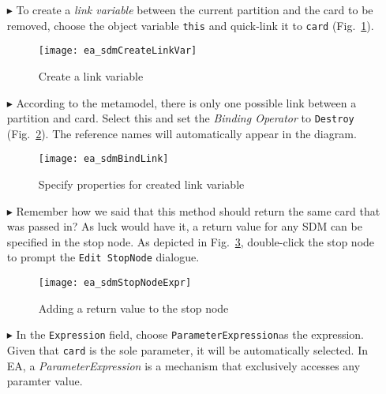 \begin{itemize}
\item[$\blacktriangleright$] To create a \emph{link variable} between the current partition and the card to be removed, choose the object variable \texttt{this}
and quick-link it to \texttt{card} (Fig.~\ref{fig:link_variable}).

\begin{figure}[htpb]
\begin{center}
  \texttt{[image: ea\_sdmCreateLinkVar]}
  \caption{Create a link variable}   
  \label{fig:link_variable}
\end{center}
\end{figure}

\item[$\blacktriangleright$] According to the metamodel, there is only one possible link between a partition and card. Select this and set the
\emph{Binding Operator} to \texttt{Destroy} (Fig.~\ref{fig:link_variable_properties}). The reference names will automatically appear in the diagram.

\vspace{0.5cm}

\begin{figure}[h!]
\begin{center} 
 \texttt{[image: ea\_sdmBindLink]}
  \caption{Specify properties for created link variable}  
  \label{fig:link_variable_properties}
\end{center}
\end{figure}

\vspace{0.5cm}

\item[$\blacktriangleright$] Remember how we said that this method should return the same card that was passed in? As luck would have it, a return value for any
SDM can be specified in the stop node. As depicted in Fig.~\ref{fig:stop_node_return_value}, double-click the stop node to prompt the \texttt{Edit StopNode} dialogue. 

\begin{figure}[htbp]
\begin{center}
  \texttt{[image: ea\_sdmStopNodeExpr]}
  \caption{Adding a return value to the stop node}  
  \label{fig:stop_node_return_value}
\end{center}
\end{figure}

\item[$\blacktriangleright$] In the \texttt{Expression} field, choose \texttt{ParameterExpression}as the expression. Given that
\texttt{card} is the sole parameter, it will be automatically selected. In EA, a \emph{ParameterExpression} is a mechanism that exclusively accesses any
paramter value.


\end{itemize}

